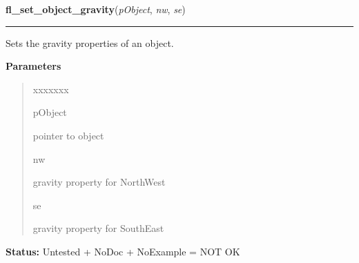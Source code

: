 \hspace{.8\funcindent}\begin{boxedminipage}{\funcwidth}

    \raggedright \textbf{fl\_set\_object\_gravity}(\textit{pObject}, \textit{nw}, \textit{se})

    \vspace{-1.5ex}

    \rule{\textwidth}{0.5\fboxrule}
\setlength{\parskip}{2ex}
    Sets the gravity properties of an object.

\setlength{\parskip}{1ex}
      \textbf{Parameters}
      \vspace{-1ex}

      \begin{quote}
        \begin{Ventry}{xxxxxxx}

          \item[pObject]

          pointer to object

          \item[nw]

          gravity property for NorthWest

          \item[se]

          gravity property for SouthEast

        \end{Ventry}

      \end{quote}

\textbf{Status:} Untested + NoDoc + NoExample = NOT OK



    \end{boxedminipage}

    \label{xformslib:library:fl_get_object_gravity}

    \vspace{0.5ex}


